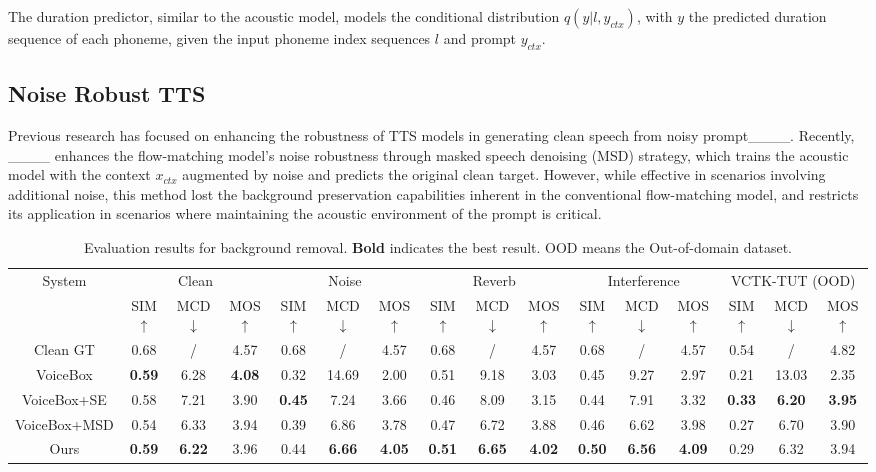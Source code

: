The duration predictor, similar to the acoustic model, models the conditional distribution $q(y | l, y_{ctx})$, with $y$ the predicted duration sequence of each phoneme, given the input phoneme index sequences $l$ and prompt $y_{ctx}$. 

\subsection{Noise Robust TTS}
Previous research has focused on enhancing the robustness of TTS models in generating clean speech from noisy prompt____. Recently, ____ enhances the flow-matching model's noise robustness through masked speech denoising (MSD) strategy, which trains the acoustic model with the context $x_{ctx}$ augmented by noise and predicts the original clean target. However, while effective in scenarios involving additional noise, this method lost the background preservation capabilities inherent in the conventional flow-matching model, and restricts its application in scenarios where maintaining the acoustic environment of the prompt is critical.




\begin{table*}[htbp]
    \centering
    \caption{Evaluation results for background removal. \textbf{Bold} indicates the best result. OOD means the Out-of-domain dataset. }
    \label{tab:removal}
    \setlength\tabcolsep{4.7pt}
    \begin{tabular}{c|ccc|ccc|ccc|ccc|ccc}
    \toprule
        \multirow{2}{*}{System} &  \multicolumn{3}{c|}{Clean} & \multicolumn{3}{c|}{Noise} & \multicolumn{3}{c|}{Reverb} & \multicolumn{3}{c}{Interference} & \multicolumn{3}{c}{VCTK-TUT (OOD)}  \\ 
     ~ & SIM$\uparrow$ & MCD$\downarrow$ & MOS$\uparrow$  &   SIM$\uparrow$  & MCD$\downarrow$ & MOS$\uparrow$ &   SIM$\uparrow$  & MCD$\downarrow$ & MOS$\uparrow$ &   SIM$\uparrow$  & MCD$\downarrow$ & MOS$\uparrow$ &   SIM$\uparrow$  & MCD$\downarrow$ & MOS$\uparrow$ \\ \midrule
Clean GT & 0.68 & / & 4.57 & 0.68 & / & 4.57 & 0.68 & / & 4.57 & 0.68 & / & 4.57 & 0.54 & / & 4.82 \\ \midrule      
        VoiceBox & \textbf{0.59} & 6.28 & \textbf{4.08} & 0.32 & 14.69 & 2.00 & 0.51 & 9.18 & 3.03 & 0.45 & 9.27 & 2.97  & 0.21 & 13.03 & 2.35 \\ 
        VoiceBox+SE & 0.58 & 7.21 & 3.90 & \textbf{0.45} & 7.24 & 3.66 & 0.46 & 8.09 & 3.15 & 0.44 & 7.91 & 3.32 & \textbf{0.33} & \textbf{6.20} & \textbf{3.95}\\ 
        VoiceBox+MSD & 0.54 & 6.33 & 3.94 & 0.39 & 6.86 & 3.78 & 0.47 & 6.72 & 3.88 & 0.46 & 6.62 & 3.98 & 0.27 & 6.70 & 3.90 \\ \midrule
        Ours & \textbf{0.59} & \textbf{6.22} & 3.96 & 0.44 & \textbf{6.66} & \textbf{4.05}& \textbf{0.51} & \textbf{6.65} & \textbf{4.02} & \textbf{0.50} & \textbf{6.56} & \textbf{4.09} & 0.29  & 6.32  & 3.94\\  
        \bottomrule
    \end{tabular}
    \vspace{-0.2cm}
\end{table*}



